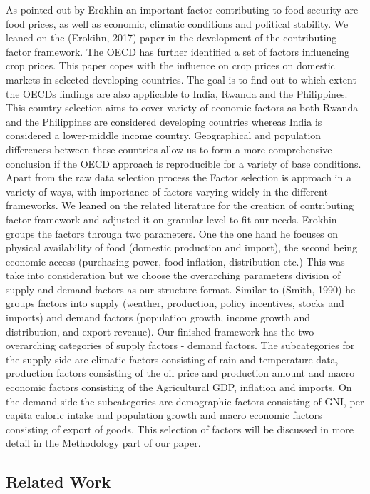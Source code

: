 \documentclass[12pt,a4paper,english]{article}
\begin{document}
As pointed out by Erokhin an important factor contributing to food security are food prices, as well as economic, climatic conditions and political stability. We leaned on the (Erokihn, 2017) paper in the development of the contributing factor framework. The OECD has further identified a set of factors influencing crop prices.
This paper copes with the influence on crop prices on domestic markets in selected developing countries. The goal is to find out to which extent the OECDs findings are also applicable to India, Rwanda and the Philippines. This country selection aims to cover variety of economic factors as both Rwanda and the Philippines are considered developing countries whereas India is considered a lower-middle income country. Geographical and population differences between these countries allow us to form a more comprehensive conclusion if the OECD approach is reproducible for a variety of base conditions. 
Apart from the raw data selection process the Factor selection is approach in a variety of ways, with importance of factors varying widely in the different frameworks. We leaned on the related literature for the creation of contributing factor framework and adjusted it on granular level to fit our needs. Erokhin groups the factors through two parameters. One the one hand he focuses on physical availability of food (domestic production and import), the second being economic access (purchasing power, food inflation, distribution etc.) This was take into consideration but we choose the overarching parameters division of supply and demand factors as our structure format. Similar to (Smith, 1990)  he groups factors into supply (weather, production, policy incentives, stocks and imports) and demand factors (population growth, income growth and distribution, and export revenue). 
Our finished framework has the two overarching categories of supply factors - demand factors. The subcategories for the supply side are climatic factors consisting of rain and temperature data, production factors consisting of the oil price and production amount and macro economic factors consisting of the Agricultural GDP, inflation and imports. On the demand side the subcategories are demographic factors consisting of GNI, per capita caloric intake and population growth and macro economic factors consisting of export of goods. This selection of factors will be discussed in more detail in the Methodology part of our paper.


\subsection{Related Work}
\end{document}
